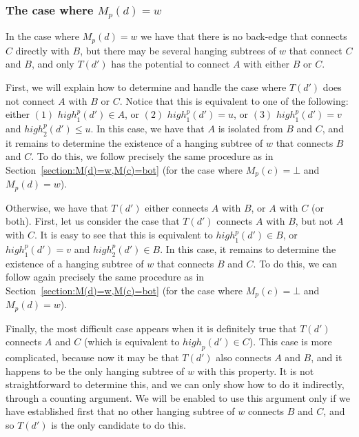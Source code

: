 \documentclass[11pt,a4paper]{article}
\begin{document}
\subsubsection{The case where $M_p(d)=w$}
\label{section:Mp(c)descDandMp(d)=w}
In the case where $M_p(d)=w$ we have that there is no back-edge that connects $C$ directly with $B$, but there may be several hanging subtrees of $w$ that connect $C$ and $B$, and only $T(d')$ has the potential to connect $A$ with either $B$ or $C$.

First, we will explain how to determine and handle the case where $T(d')$ does not connect $A$ with $B$ or $C$. Notice that this is equivalent to one of the following: either $(1)$ $\mathit{high}^p_1(d')\in A$, or $(2)$ $\mathit{high}^p_1(d')=u$, or $(3)$ $\mathit{high}^p_1(d')=v$ and $\mathit{high}^p_2(d')\leq u$. In this case, we have that $A$ is isolated from $B$ and $C$, and it remains to determine the existence of a hanging subtree of $w$ that connects $B$ and $C$. To do this, we follow precisely the same procedure as in Section~\ref{section:M(d)=w,M(c)=bot} (for the case where $M_p(c)=\bot$ and $M_p(d)=w$).

Otherwise, we have that $T(d')$ either connects $A$ with $B$, or $A$ with $C$ (or both). First, let us consider the case that $T(d')$ connects $A$ with $B$, but not $A$ with $C$. It is easy to see that this is equivalent to $\mathit{high}^p_1(d')\in B$, or $\mathit{high}^p_1(d')=v$ and $\mathit{high}^p_2(d')\in B$. In this case, it remains to determine the existence of a hanging subtree of $w$ that connects $B$ and $C$. To do this, we can follow again precisely the same procedure as in Section~\ref{section:M(d)=w,M(c)=bot} (for the case where $M_p(c)=\bot$ and $M_p(d)=w$).

Finally, the most difficult case appears when it is definitely true that $T(d')$ connects $A$ and $C$ (which is equivalent to $\mathit{high}_p(d')\in C$). This case is more complicated, because now it may be that $T(d')$ also connects $A$ and $B$, and it happens to be the only hanging subtree of $w$ with this property. It is not straightforward to determine this, and we can only show how to do it indirectly, through a counting argument. We will be enabled to use this argument only if we have established first that no other hanging subtree of $w$ connects $B$ and $C$, and so $T(d')$ is the only candidate to do this. 
\end{document}
